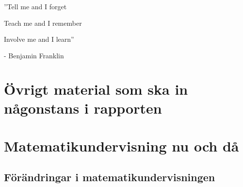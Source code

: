 \documentclass[11pt,a4paper]{article}
\begin{document}



\newpage

\begin{centering}
\Huge
''Tell me and I forget 

Teach me and I remember

Involve me and I learn''

\end{centering}
\bigskip
\begin{centering}

\Large
- Benjamin Franklin

\end{centering}
\newpage

\renewcommand\abstractname{Sammandrag}\begin{abstract}

\end{abstract}

\newpage

\renewcommand\abstractname{Abstract}
\begin{abstract} 

\end{abstract}

\newpage
 
\tableofcontents

\newpage
{}

\section*{Övrigt material som ska in någonstans i rapporten}
    

\section{Matematikundervisning nu och då}
    
    \label{sec:Bakgrund}
    
    
    \subsection{Förändringar i matematikundervisningen}
        \label{sec:Forandringar}
        
        
\end{document}

